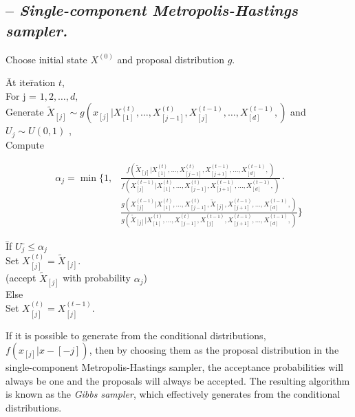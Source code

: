 \subsection{\alg -- {\it Single-component Metropolis-Hastings sampler.}}
Choose initial state $X^{(0)}$ and proposal distribution $g$.\\
\begin{tabbing}
\=At ite\=ration $t$,\\
		\>For j = $1, 2,\ldots, d,$\\
				\>		\>Generate $\tilde{ X}_{[j]}\sim g(x_{[j]}|X^{(t)}_{[1]},\ldots,X^{(t)}_{[j-1]},X^{(t-1)}_{[j]},\ldots,X^{(t-1)}_{[d]},)$  and $U_j\sim U(0,1)$ ,\\
				\>\>Compute\\
\end{tabbing}



\begin{equation}
\begin{split}
\alpha_j=\min\{1,&\frac{f(\tilde{X}_{[j]}|X^{(t)}_{[1]},\ldots,X^{(t)}_{[j-1]},X^{(t-1)}_{[j+1]},\ldots,X^{(t-1)}_{[d]},)}{f(X^{(t-1)}_{[j]}|X^{(t)}_{[1]},\ldots,X^{(t)}_{[j-1]},X^{(t-1)}_{[j+1]},\ldots,X^{(t-1)}_{[d]},)}\cdot\\
&\frac{g(X^{(t-1)}_{[j]}|X^{(t)}_{[1]},\ldots,X^{(t)}_{[j-1]},\tilde{X}_{[j]},X^{(t-1)}_{[j+1]},\ldots,X^{(t-1)}_{[d]},)}{g(\tilde{X}_{[j]}|X^{(t)}_{[1]},\ldots,X^{(t)}_{[j-1]},X^{(t-1)}_{[j]},X^{(t-1)}_{[j+1]},\ldots,X^{(t-1)}_{[d]},)}\}
\end{split} 
\end{equation}

\begin{tabbing}
\=If $U_j$\=$\leq\alpha_j$\\
\>\>Set $X^{(t)}_{[j]}=\tilde{X}_{[j]}.$\\(accept $\tilde{X}_[j]$ with probability $\alpha_j$)\\
\>Else\>\\
\>\>Set $X^{(t)}_{[j]}=X^{(t-1)}_{[j]}.$\\
\end{tabbing}

If it is possible to generate from the conditional distributions, $f(x_{[j]}|x-{[-j]})$, then by choosing them as the proposal distribution in the single-component Metropolis-Hastings sampler, the acceptance probabilities will always be one and the proposals will always be accepted. The resulting algorithm is known as the {\it Gibbs sampler}, which effectively generates from the conditional distributions.
